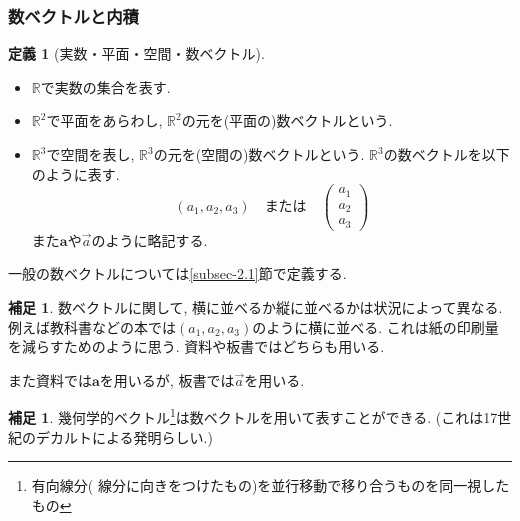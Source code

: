 \documentclass[dvipdfmx,a4paper,11pt]{article}
\newcommand{\R}{\mathbb{R}}
\theoremstyle{definition}
\newtheorem{dfn}[thm]{定義}
\newtheorem{rem}[thm]{補足}
\begin{document}
\subsubsection{数ベクトルと内積}
 \begin{tcolorbox}[
    colback = white,
    colframe = green!35!black,
    fonttitle = \bfseries,
    breakable = true]
    \begin{dfn}[実数・平面・空間・数ベクトル]
    \text{}
    \begin{itemize}
      \setlength{\parskip}{0cm} 
  \setlength{\itemsep}{0cm}
    \item $\R$で実数の集合を表す. 
    \item  $\R^2$で平面をあらわし, $\R^2$の元を(平面の)数ベクトルという.
    \item $\R^3$で空間を表し, $\R^3$の元を(空間の)数ベクトルという. $\R^3$の数ベクトルを以下のように表す. 
    $$
    (a_1, a_2, a_3)
    \quad
    \text{または}
    \quad
     \begin{pmatrix}
     a_1\\a_2\\a_3
      \end{pmatrix}
    $$
    また$\bm{a} $や$\overset{\to}{a}$のように略記する.
     \end{itemize}
         \end{dfn}
 \end{tcolorbox}
 一般の数ベクトルについては\ref{subsec-2.1}節で定義する. 
 
     \begin{rem}
     数ベクトルに関して, 横に並べるか縦に並べるかは状況によって異なる. 例えば教科書などの本では$(a_1, a_2, a_3)$のように横に並べる. これは紙の印刷量を減らすためのように思う. 資料や板書ではどちらも用いる.
     
     また資料では$\bm{a}$を用いるが, 板書では$\overset{\to}{a}$を用いる.
     \end{rem}
 \begin{rem}
幾何学的ベクトル\footnote{有向線分( 線分に向きをつけたもの)を並行移動で移り合うものを同一視したもの}は数ベクトルを用いて表すことができる. (これは17世紀のデカルトによる発明らしい.)
 \end{rem}
\end{document}
